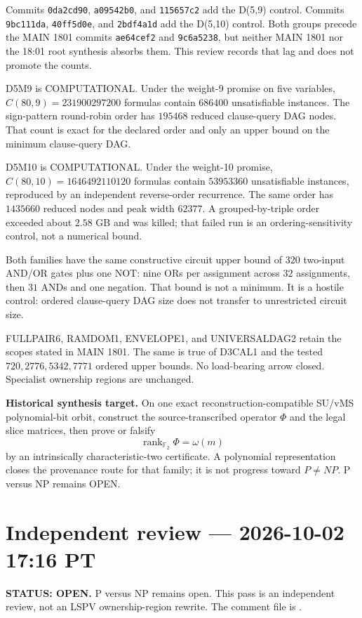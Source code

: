 \documentclass[11pt]{article}
\begin{document}
Commits \texttt{0da2cd90}, \texttt{a09542b0}, and \texttt{115657c2} add the D(5,9) control.
Commits \texttt{9bc111da}, \texttt{40ff5d0e}, and \texttt{2bdf4a1d} add the D(5,10) control.
Both groups precede the MAIN 1801 commits \texttt{ae64cef2} and \texttt{9c6a5238}, but neither
MAIN 1801 nor the 18:01 root synthesis absorbs them. This review records that lag and does
not promote the counts.

D5M9 is COMPUTATIONAL. Under the weight-9 promise on five variables,
\(C(80,9)=231900297200\) formulas contain \(686400\) unsatisfiable instances.
The sign-pattern round-robin order has \(195468\) reduced clause-query DAG nodes.
That count is exact for the declared order and only an upper bound on the minimum
clause-query DAG.

D5M10 is COMPUTATIONAL. Under the weight-10 promise,
\(C(80,10)=1646492110120\) formulas contain \(53953360\) unsatisfiable instances,
reproduced by an independent reverse-order recurrence.
The same order has \(1435660\) reduced nodes and peak width \(62377\).
A grouped-by-triple order exceeded about \(2.58\) GB and was killed; that failed run is an
ordering-sensitivity control, not a numerical bound.

Both families have the same constructive circuit upper bound of \(320\) two-input AND/OR
gates plus one NOT: nine ORs per assignment across \(32\) assignments, then \(31\) ANDs
and one negation. That bound is not a minimum. It is a hostile control: ordered
clause-query DAG size does not transfer to unrestricted circuit size.

FULLPAIR6, RAMDOM1, ENVELOPE1, and UNIVERSALDAG2 retain the scopes stated in
MAIN 1801. The same is true of D3CAL1 and the tested
\(720,2776,5342,7771\) ordered upper bounds.
No load-bearing arrow closed. Specialist ownership regions are unchanged.

\begin{candidatebox}
\textbf{Historical synthesis target.}
On one exact reconstruction-compatible SU/vMS polynomial-bit orbit, construct the
source-transcribed operator \(\Phi\) and the legal slice matrices, then prove or falsify
\[
\operatorname{rank}_{\mathbb F_2}\Phi=\omega(m)
\]
by an intrinsically characteristic-two certificate. A polynomial representation closes the
provenance route for that family; it is not progress toward \(P\neq NP\). P versus NP remains OPEN.
\end{candidatebox}

\section{Independent review --- 2026-10-02 17:16 PT}
\textbf{STATUS: OPEN.} P versus NP remains open. This pass is an independent review, not an
LSPV ownership-region rewrite. The comment file is
.
\end{document}
